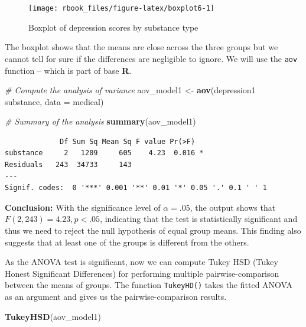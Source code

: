 \documentclass[]{book}
\newenvironment{Shaded}{\begin{snugshade}}{\end{snugshade}}
\newcommand{\CommentTok}[1]{\textcolor[rgb]{0.56,0.35,0.01}{\textit{#1}}}
\newcommand{\DataTypeTok}[1]{\textcolor[rgb]{0.13,0.29,0.53}{#1}}
\newcommand{\KeywordTok}[1]{\textcolor[rgb]{0.13,0.29,0.53}{\textbf{#1}}}
\newcommand{\NormalTok}[1]{#1}
\newcommand{\OperatorTok}[1]{\textcolor[rgb]{0.81,0.36,0.00}{\textbf{#1}}}
\newcommand{\StringTok}[1]{\textcolor[rgb]{0.31,0.60,0.02}{#1}}
\begin{document}
\begin{figure}

{\centering \texttt{[image: rbook\_files/figure-latex/boxplot6-1]} 

}

\caption{Boxplot of depression scores by substance type}\label{fig:boxplot6}
\end{figure}

The boxplot shows that the means are close across the three groups but we cannot tell for sure if the differences are negligible to ignore. We will use the \texttt{aov} function -- which is part of base \textbf{R}.

\begin{Shaded}
\begin{Highlighting}[]
\CommentTok{# Compute the analysis of variance}
\NormalTok{aov_model1 <-}\StringTok{ }\KeywordTok{aov}\NormalTok{(depression1 }\OperatorTok{~}\StringTok{ }\NormalTok{substance, }\DataTypeTok{data =}\NormalTok{ medical)}

\CommentTok{# Summary of the analysis}
\KeywordTok{summary}\NormalTok{(aov_model1)}
\end{Highlighting}
\end{Shaded}

\begin{verbatim}
             Df Sum Sq Mean Sq F value Pr(>F)  
substance     2   1209     605    4.23  0.016 *
Residuals   243  34733     143                 
---
Signif. codes:  0 '***' 0.001 '**' 0.01 '*' 0.05 '.' 0.1 ' ' 1
\end{verbatim}

\textbf{Conclusion:} With the significance level of \(\alpha=.05\), the output shows that \(F(2, 243) = 4.23, p < .05\), indicating that the test is statistically significant and thus we need to reject the null hypothesis of equal group means. This finding also suggests that at least one of the groups is different from the others.

As the ANOVA test is significant, now we can compute Tukey HSD (Tukey Honest Significant Differences) for performing multiple pairwise-comparison between the means of groups. The function \texttt{TukeyHD()} takes the fitted ANOVA as an argument and gives us the pairwise-comparison results.

\begin{Shaded}
\begin{Highlighting}[]
\KeywordTok{TukeyHSD}\NormalTok{(aov_model1)}
\end{Highlighting}
\end{Shaded}
\end{document}
